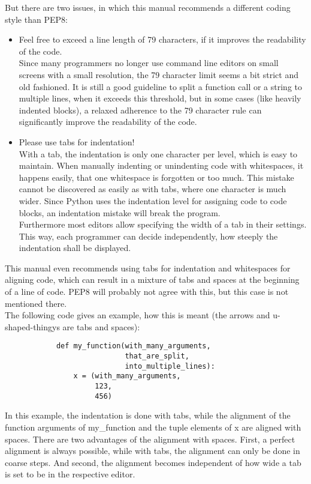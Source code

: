 		But there are two issues, in which this manual recommends a different coding style than PEP8:
		\begin{itemize}
			\item Feel free to exceed a line length of 79 characters, if it improves the readability of the code.\\
			      Since many programmers no longer use command line editors on small screens with a small resolution, the 79 character limit seems a bit strict and old fashioned.
			      It is still a good guideline to split a function call or a string to multiple lines, when it exceeds this threshold, but in some cases (like heavily indented blocks), a relaxed adherence to the 79 character rule can significantly improve the readability of the code.
			\item Please use tabs for indentation!\\
			      With a tab, the indentation is only one character per level, which is easy to maintain.
			      When manually indenting or unindenting code with whitespaces, it happens easily, that one whitespace is forgotten or too much.
			      This mistake cannot be discovered as easily as with tabs, where one character is much wider.
			      Since Python uses the indentation level for assigning code to code blocks, an indentation mistake will break the program.\\
			      Furthermore most editors allow specifying the width of a tab in their settings.
			      This way, each programmer can decide independently, how steeply the indentation shall be displayed.
		\end{itemize}

		This manual even recommends using tabs for indentation and whitespaces for aligning code, which can result in a mixture of tabs and spaces at the beginning of a line of code.
		PEP8 will probably not agree with this, but this case is not mentioned there.\\
		The following code gives an example, how this is meant (the arrows and u-shaped-thingys are tabs and spaces):
		\begin{verbatim}
			def my_function(with_many_arguments,
			                that_are_split,
			                into_multiple_lines):
				x = (with_many_arguments,
				     123,
				     456)
		\end{verbatim}
		In this example, the indentation is done with tabs, while the alignment of the function arguments of {\normalfont \ttfamily my\_function} and the tuple elements of {\normalfont \ttfamily x} are aligned with spaces.
		There are two advantages of the alignment with spaces.
		First, a perfect alignment is always possible, while with tabs, the alignment can only be done in coarse steps.
		And second, the alignment becomes independent of how wide a tab is set to be in the respective editor.

